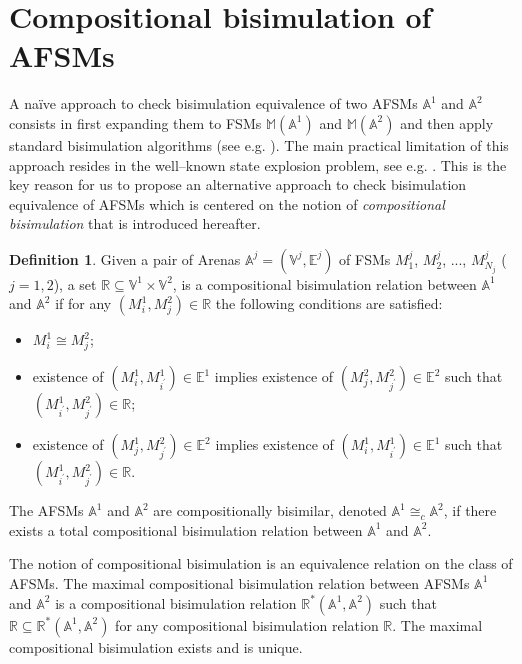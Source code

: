 \documentclass{amsart}
\theoremstyle{definition}
\newtheorem{definition}[theorem]{Definition}
\theoremstyle{remark}
\numberwithin{equation}{section}
\begin{document}
\section{Compositional bisimulation of AFSMs}
A na\"ive approach to check bisimulation equivalence of two AFSMs $\mathbb{A}^{1}$ and $\mathbb{A}^{2}$ consists in first expanding them to FSMs $\mathbb{M}(\mathbb{A}^{1})$ and $\mathbb{M}(\mathbb{A}^{2})$ and then apply standard bisimulation algorithms (see e.g. \cite{BisAlg,Piazza,Hopcroft}). 
The main practical limitation of this approach resides in the well--known state explosion problem, see e.g. \cite{StateExplosion2,StateExplosion1}.
This is the key reason for us to propose an alternative approach to check bisimulation equivalence of AFSMs which is centered on the notion of \textit{compositional bisimulation} that is introduced hereafter.
\begin{definition}
\label{Hbis}
Given a pair of Arenas 
$\mathbb{A}^{j}=(\mathbb{V}^{j},\mathbb{E}^{j})$ of FSMs $M_{1}^{j}$, $M_{2}^{j}$, ..., $M_{N_{j}}^{j}$ ($j=1,2$), a set 
\mbox{$\mathbb{R}\subseteq \mathbb{V}^{1}\times \mathbb{V}^{2}$}, is a compositional bisimulation relation between $\mathbb{A}^{1}$ and $\mathbb{A}^{2}$ if for any $(M_{i}^{1},M_{j}^{2})\in \mathbb{R}$ the following conditions are satisfied:
\begin{itemize}
\item $M_{i}^{1}\cong M_{j}^{2}$;
\item existence of $(M_{i}^{1},M_{i^{\prime}}^{1})\in\mathbb{E}^{1}$ implies existence of $(M_{j}^{2},M_{j^{\prime}}^{2})\in\mathbb{E}^{2}$ such that $(M_{i^{\prime}}^{1},M_{j^{\prime}}^{2})\in \mathbb{R}$;
\item existence of $(M_{j}^{1},M_{j^{\prime}}^{2})\in\mathbb{E}^{2}$ implies existence of $(M_{i}^{1},M_{i^{\prime}}^{1})\in\mathbb{E}^{1}$ such that $(M_{i^{\prime}}^{1},M_{j^{\prime}}^{2})\in \mathbb{R}$.
\end{itemize}
The AFSMs $\mathbb{A}^{1}$ and $\mathbb{A}^{2}$ are compositionally bisimilar, denoted $\mathbb{A}^{1} \cong_{c} \mathbb{A}^{2}$, if there exists a total compositional bisimulation relation between $\mathbb{A}^{1}$ and $\mathbb{A}^{2}$.
\end{definition}
The notion of compositional bisimulation is an equivalence relation on the class of AFSMs. The maximal compositional bisimulation relation between AFSMs $\mathbb{A}^{1}$ and $\mathbb{A}^{2}$ is a compositional bisimulation relation $\mathbb{R}^{\ast}(\mathbb{A}^{1},\mathbb{A}^{2})$ such that $\mathbb{R}\subseteq \mathbb{R}^{\ast}(\mathbb{A}^{1},\mathbb{A}^{2})$ for any compositional bisimulation relation $\mathbb{R}$. The maximal compositional bisimulation exists and is unique. 
\end{document}

